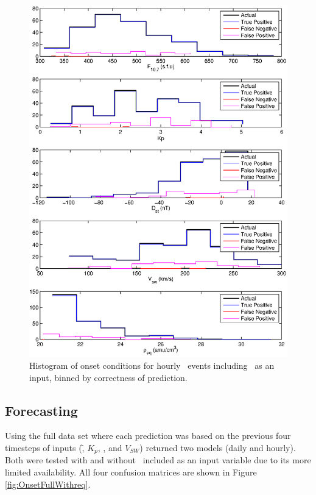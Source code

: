 \begin{figure}[htp!]
	\centering
	\includegraphics[width=1\linewidth]{Figures/CH5/NNBinaryOnset-hourly-withreq-hist.eps}
	\caption{Histogram of onset conditions for hourly \req\ events including \req\ as an input, binned by correctness of prediction.}
	\label{fig:OnsetWithreq-hist}
\end{figure}


\clearpage

\subsection{Forecasting}

Using the full data set where each prediction was based on the previous four timesteps of inputs (\f, $K_p$, \dst, and $V_{SW}$) returned two models (daily and hourly). Both were tested with and without \req\ included as an input variable due to its more limited availability. All four confusion matrices are shown in Figure \ref{fig:OnsetFullWithreq}.

